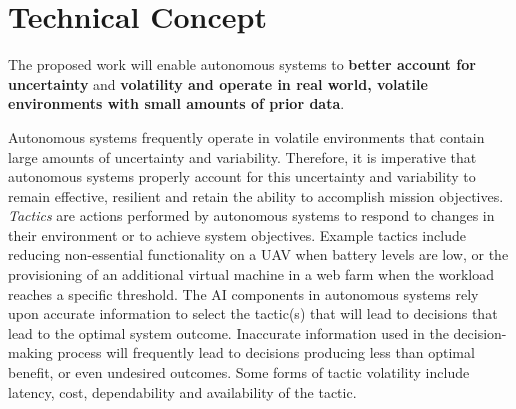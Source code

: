 \documentclass[12pt]{article}
\begin{document}
\cfoot{\thepage}
\setcounter{tocdepth}{1} %

\cfoot{} %





\setcounter{page}{1}


\section{Technical Concept}

The proposed work will enable autonomous systems to \textbf{better account for uncertainty} and \textbf{volatility and operate in real world, volatile environments with small amounts of prior data}.







Autonomous systems frequently operate in volatile environments that contain large amounts of uncertainty and variability. Therefore, it is imperative that autonomous systems properly account for this uncertainty and variability to remain effective, resilient and retain the ability to accomplish mission objectives. \emph{Tactics} are actions performed by autonomous systems to respond to changes in their environment or to achieve system objectives. Example tactics include reducing non-essential functionality on a UAV when battery levels are low, or the provisioning of an additional virtual machine in a web farm when the workload reaches a specific threshold. The AI components in autonomous systems rely upon accurate information to select the tactic(s) that will lead to decisions that lead to the optimal system outcome. Inaccurate information used in the decision-making process will frequently lead to decisions producing less than optimal benefit, or even undesired outcomes. Some forms of tactic volatility include latency, cost, dependability and availability of the tactic. 
\end{document}
